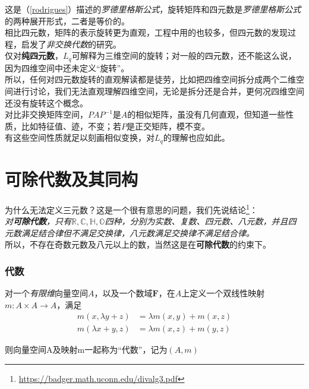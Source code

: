 \documentclass[hpyerref,UTF8,a4paper,titlepage,12pt,oneside]{ctexbook}
\theoremstyle{definition}
\begin{document}
	这是（\ref{rodrigues}）描述的\textit{罗德里格斯公式}，旋转矩阵和四元数是\textit{罗德里格斯公式}的两种展开形式，二者是等价的。\\

	相比四元数，矩阵的表示旋转更为直观，工程中用的也较多，但四元数的发现过程，启发了\textit{非交换代数}的研究。\\

	仅对\textbf{纯四元数}，$L_q$可解释为三维空间的旋转；对一般的四元数，还不能这么说，因为四维空间中还未定义“旋转”。\\

	所以，任何对四元数旋转的直观解读都是徒劳，比如把四维空间拆分成两个二维空间进行讨论，我们无法直观理解四维空间，无论是拆分还是合并，更何况四维空间还没有旋转这个概念。\\

	对比非交换矩阵空间，$PAP^{-1}$是$A$的相似矩阵，虽没有几何直观，但知道一些性质，比如特征值、迹，不变；若$P$是正交矩阵，模不变。\\

	有这些空间性质就足以刻画相似变换，对$L_q$的理解也应如此。

\section{可除代数及其同构}
	为什么无法定义三元数？这是一个很有意思的问题，我们先说结论\footnote{\url{https://badger.math.uconn.edu/divalg3.pdf}}：\\

		\textit{对\textbf{可除代数}，只有$\mathbb{R},\mathbb{C},\mathbb{H},\mathbb{O}$四种，分别为实数、复数、四元数、八元数，并且四元数满足结合律但不满足交换律，八元数满足交换律不满足结合律。}\\

	所以，不存在奇数元数及八元以上的数，当然这是在\textbf{可除代数}的约束下。

	\subsubsection*{代数}
		对一个\textit{有限维}向量空间$A$，以及一个数域$\mathbf{F}$，在$A$上定义一个双线性映射$m: A \times A \rightarrow A$，满足
		\begin{align*}
			m(x,\lambda y+ z) &= \lambda m(x,y) + m(x,z)\\
			m(\lambda x +y, z) &= \lambda m(x,z) + m(y,z)
		\end{align*}

		则向量空间A及映射m一起称为“代数”，记为$(A,m)$
\end{document}
